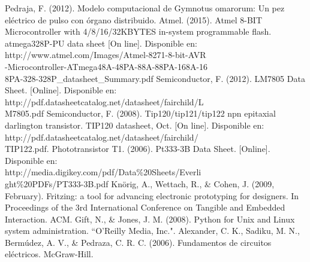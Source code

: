 \documentclass[12]{article}
\begin{document}
\begin{multicols}{2}
\begin{thebibliography}{99}
 Pedraja, F. (2012). Modelo computacional de Gymnotus omarorum: Un pez eléctrico de pulso con órgano distribuido.
 Atmel. (2015). Atmel 8-BIT Microcontroller with 4/8/16/32KBYTES in-system programmable flash. atmega328P-PU data sheet [On line]. Disponible en: \\ http://www.atmel.com/Images/Atmel-8271-8-bit-AVR\\-Microcontroller-ATmega48A-48PA-88A-88PA-168A-16\\8PA-328-328P\_datasheet\_Summary.pdf
 Semiconductor, F. (2012). LM7805 Data Sheet. [Online]. Disponible en:\\ http://pdf.datasheetcatalog.net/datasheet/fairchild/L\\M7805.pdf
 Semiconductor, F. (2008). Tip120/tip121/tip122 npn epitaxial darlington transistor. TIP120 datasheet, Oct. [On line]. Disponible en:\\ http://pdf.datasheetcatalog.net/datasheet/fairchild/\\TIP122.pdf.
 Phototransistor T1. (2006). Pt333-3B Data Sheet. [Online]. Disponible en:\\ http://media.digikey.com/pdf/Data\%20Sheets/Everli\\ght\%20PDFs/PT333-3B.pdf
 Knörig, A., Wettach, R., \& Cohen, J. (2009, February). Fritzing: a tool for advancing electronic prototyping for designers. In Proceedings of the 3rd International Conference on Tangible and Embedded Interaction. ACM.
 Gift, N., \& Jones, J. M. (2008). Python for Unix and Linux system administration. ``O'Reilly Media, Inc.".
 Alexander, C. K., Sadiku, M. N., Bermúdez, A. V., \& Pedraza, C. R. C. (2006). Fundamentos de circuitos eléctricos. McGraw-Hill. 
\end{thebibliography}
\end{multicols}
{}
\appendix
\addappheadtotoc
\appendixpage
\end{document}
